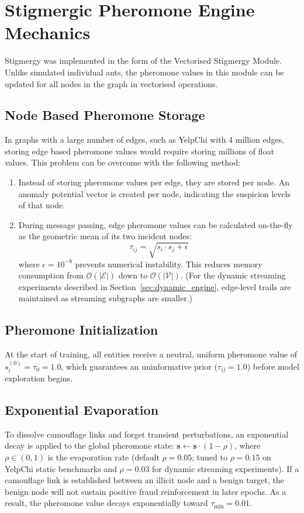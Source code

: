 \section[Stigmergic Pheromone Engine Mechanics]{Stigmergic Pheromone Engine Mechanics}
\label{sec:pheromone_engine}
\label{sec:aco_engine}

Stigmergy was implemented in the form of the Vectorised Stigmergy Module. Unlike simulated individual ants, the pheromone values in this module can be updated for all nodes in the graph in vectorised operations.

\subsection{Node Based Pheromone Storage}
In graphs with a large number of edges, such as YelpChi with 4 million edges, storing edge based pheromone values would require storing millions of float values. This problem can be overcome with the following method:
\begin{enumerate}
    \item Instead of storing pheromone values per edge, they are stored per node. An anomaly potential vector is created per node, indicating the suspicion levels of that node.
    \item During message passing, edge pheromone values can be calculated on-the-fly as the geometric mean of its two incident nodes:
    \begin{equation}
        \tau_{ij} = \sqrt{s_i \cdot s_j + \epsilon}
        \label{eq:edge_pheromone_derivation}
    \end{equation}
    where $\epsilon = 10^{-8}$ prevents numerical instability. This reduces memory consumption from $\mathcal{O}(|\mathcal{E}|)$ down to $\mathcal{O}(|\mathcal{V}|)$. (For the dynamic streaming experiments described in Section~\ref{sec:dynamic_engine}, edge-level trails are maintained as streaming subgraphs are smaller.)
\end{enumerate}

\subsection{Pheromone Initialization}
At the start of training, all entities receive a neutral, uniform pheromone value of $s_i^{(0)} = \tau_0 = 1.0$, which guarantees an uninformative prior ($\tau_{ij} = 1.0$) before model exploration begins.

\subsection{Exponential Evaporation}
To dissolve camouflage links and forget transient perturbations, an exponential decay is applied to the global pheromone state: $\mathbf{s} \leftarrow \mathbf{s} \cdot (1 - \rho)$, where $\rho \in (0, 1)$ is the evaporation rate (default $\rho = 0.05$; tuned to $\rho = 0.15$ on YelpChi static benchmarks and $\rho = 0.03$ for dynamic streaming experiments). If a camouflage link is established between an illicit node and a benign target, the benign node will not sustain positive fraud reinforcement in later epochs. As a result, the pheromone value decays exponentially toward $\tau_{\min} = 0.01$.

